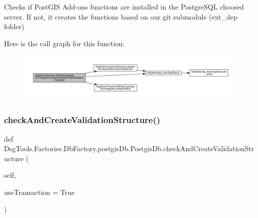 \begin{DoxyVerb}Checks if PostGIS Add-ons functions are installed in the PostgreSQL choosed server.
If not, it creates the functions based on our git submodule (ext_dep folder)
\end{DoxyVerb}
 Here is the call graph for this function\+:
\nopagebreak
\begin{figure}[H]
\begin{center}
\leavevmode
\includegraphics[width=350pt]{class_dsg_tools_1_1_factories_1_1_db_factory_1_1postgis_db_1_1_postgis_db_abf29f610d79818e71520eaa4d85b47bb_cgraph}
\end{center}
\end{figure}
\mbox{\label{class_dsg_tools_1_1_factories_1_1_db_factory_1_1postgis_db_1_1_postgis_db_a8e1f9176191851a4f0433c1cb10b0c39}} 
\subsubsection{\texorpdfstring{check\+And\+Create\+Validation\+Structure()}{checkAndCreateValidationStructure()}}
{\footnotesize\ttfamily def Dsg\+Tools.\+Factories.\+Db\+Factory.\+postgis\+Db.\+Postgis\+Db.\+check\+And\+Create\+Validation\+Structure (\begin{DoxyParamCaption}\item[{}]{self,  }\item[{}]{use\+Transaction = {\ttfamily True} }\end{DoxyParamCaption})}

